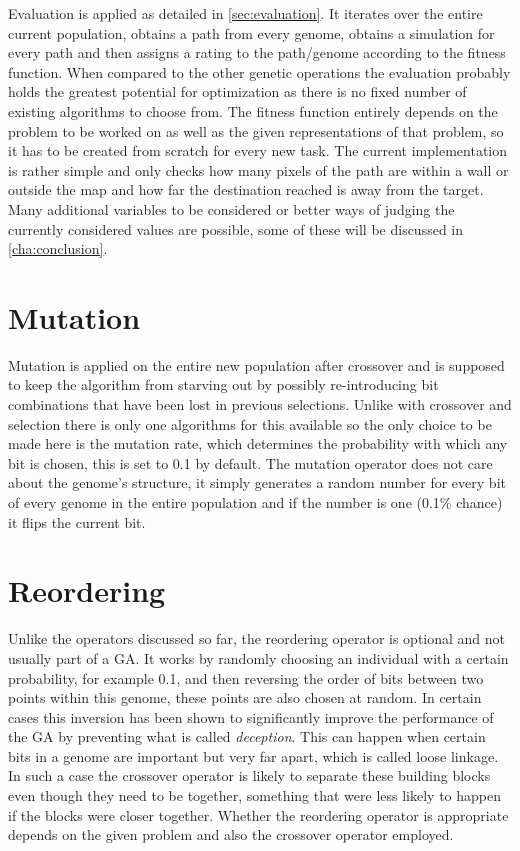 Evaluation is applied as detailed in \ref{sec:evaluation}. It iterates over the entire current population, obtains a path from every genome, obtains a simulation for every path and then assigns a rating to the path/genome according to the fitness function. 
When compared to the other genetic operations the evaluation probably holds the greatest potential for optimization as there is no fixed number of existing algorithms to choose from. The fitness function entirely depends on the problem to be worked on as well as the given representations of that problem, so it has to be created from scratch for every new task. The current implementation is rather simple and only checks how many pixels of the path are within a wall or outside the map and how far the destination reached is away from the target. Many additional variables to be considered or better ways of judging the currently considered values are possible, some of these will be discussed in \ref{cha:conclusion}.

\section{Mutation} %
\label{sec:imp_mutation}

Mutation is applied on the entire new population after crossover and is supposed to keep the algorithm from starving out by possibly re-introducing bit combinations that have been lost in previous selections. Unlike with crossover and selection there is only one algorithms for this available so the only choice to be made here is the mutation rate, which determines the probability with which any bit is chosen, this is set to 0.1 by default. The mutation operator does not care about the genome's structure, it simply generates a random number for every bit of every genome in the entire population and if the number is one (0.1\% chance) it flips the current bit.

\section{Reordering}
\label{sec:reordering}

Unlike the operators discussed so far, the reordering operator is optional and not usually part of a GA. It works by randomly choosing an individual with a certain probability, for example 0.1, and then reversing the order of bits between two points within this genome, these points are also chosen at random. In certain cases this inversion has been shown to significantly improve the performance of the GA by preventing what is called \textit{deception}\cite{8}. This can happen when certain bits in a genome are important but very far apart, which is called loose linkage. In such a case the crossover operator is likely to separate these building blocks even though they need to be together, something that were less likely to happen if the blocks were closer together. Whether the reordering operator is appropriate depends on the given problem and also the crossover operator employed. \cite{8} %
